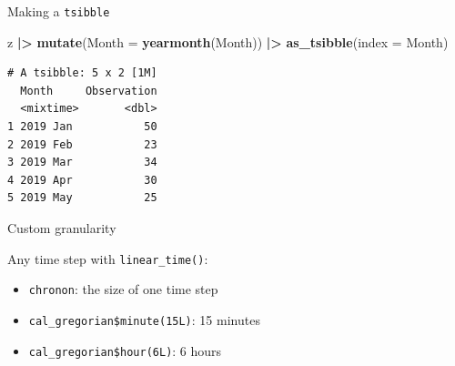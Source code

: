 \documentclass[
  14pt,
  ignorenonframetext,
  aspectratio=169,
]{beamer}
\newenvironment{Shaded}{\begin{snugshade}}{\end{snugshade}}
\newcommand{\AttributeTok}[1]{\textcolor[rgb]{0.13,0.29,0.53}{#1}}
\newcommand{\DecValTok}[1]{\textcolor[rgb]{0.00,0.00,0.81}{#1}}
\newcommand{\DocumentationTok}[1]{\textcolor[rgb]{0.56,0.35,0.01}{\textbf{\textit{#1}}}}
\newcommand{\FunctionTok}[1]{\textcolor[rgb]{0.13,0.29,0.53}{\textbf{#1}}}
\newcommand{\NormalTok}[1]{#1}
\newcommand{\OtherTok}[1]{\textcolor[rgb]{0.56,0.35,0.01}{#1}}
\newcommand{\SpecialCharTok}[1]{\textcolor[rgb]{0.81,0.36,0.00}{\textbf{#1}}}
\newcommand{\StringTok}[1]{\textcolor[rgb]{0.31,0.60,0.02}{#1}}
\providecommand{\tightlist}{%
  \setlength{\itemsep}{0pt}\setlength{\parskip}{0pt}}
\renewenvironment{Shaded}{\vspace*{0.15cm}\color{black}\fontsize{10}{10}\sf\begin{snugshade}\color{black}}{\end{snugshade}}
\begin{document}
\begin{frame}[fragile]{Making a \texttt{tsibble}}
\protect{}\label{making-a-tsibble}
\fontsize{12}{13}\sf

\begin{Shaded}
\begin{Highlighting}[]
\NormalTok{z }\SpecialCharTok{|\textgreater{}}
  \FunctionTok{mutate}\NormalTok{(}\AttributeTok{Month =} \FunctionTok{yearmonth}\NormalTok{(Month)) }\SpecialCharTok{|\textgreater{}}
  \FunctionTok{as\_tsibble}\NormalTok{(}\AttributeTok{index =}\NormalTok{ Month)}
\end{Highlighting}
\end{Shaded}

\begin{verbatim}
# A tsibble: 5 x 2 [1M]
  Month     Observation
  <mixtime>       <dbl>
1 2019 Jan           50
2 2019 Feb           23
3 2019 Mar           34
4 2019 Apr           30
5 2019 May           25
\end{verbatim}
\end{frame}

\begin{frame}[fragile]{Custom granularity}
\protect{}\label{custom-granularity}
\fontsize{11}{12}\sf

Any time step with \texttt{linear\_time()}:

\begin{Shaded}
\end{Shaded}

\pause

\begin{itemize}
\tightlist
\item
  \texttt{chronon}: the size of one time step
\item
  \texttt{cal\_gregorian\$minute(15L)}: 15 minutes
\item
  \texttt{cal\_gregorian\$hour(6L)}: 6 hours
\end{itemize}
\end{frame}
\end{document}
